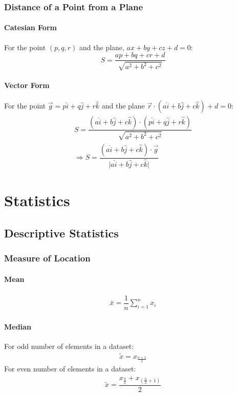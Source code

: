 \documentclass[openany, oneside]{book}
\begin{document}
\section{Distance of a Point from a Plane}
\subsection{Catesian Form}
For the point $(p,q,r)$ and the plane, $ax+by+cz+d=0$:
\begin{equation}
S=\dfrac{ap+bq+cr+d}{\sqrt{a^2+b^2+c^2}}
\end{equation}
\subsection{Vector Form}
For the point $\vec{g}=p\hat{i}+q\hat{j}+r\hat{k}$ and the plane $\vec{r}\cdot(a\hat{i}+b\hat{j}+c\hat{k})+d=0$:
\begin{align}
S=\dfrac{(a\hat{i}+b\hat{j}+c\hat{k})\cdot(p\hat{i}+q\hat{j}+r\hat{k})}{\sqrt{a^2+b^2+c^2}}\\
\Rightarrow S=\dfrac{(a\hat{i}+b\hat{j}+c\hat{k})\cdot\vec{g}}{\lvert a\hat{i}+b\hat{j}+c\hat{k} \rvert}
\end{align}

\part{Statistics}
\chapter{Descriptive Statistics}
\section{Measure of Location}
\subsection{Mean}
\begin{align}
	\bar{x} = \dfrac{1}{n} \displaystyle\sum_{i=1}^{n} x_i
\end{align}
\subsection{Median}
For odd number of elements in a dataset:
\begin{align}
	\tilde{x} = x_{\frac{n+1}{2}}
\end{align}
For even number of elements in a dataset:
\begin{align}
	\tilde{x} = \dfrac{x_{\frac{n}{2}}+x_{\left(\frac{n}{2}+1\right)}}{2}
\end{align}
\end{document}
